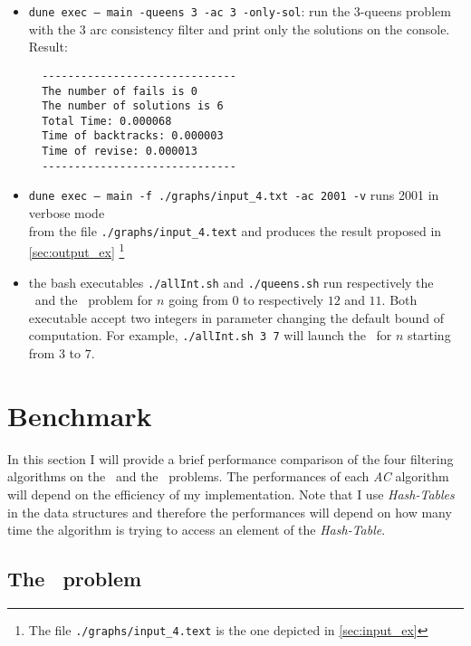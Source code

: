 \documentclass{rapport}
\begin{document}
\begin{itemize}
  \item \texttt{dune exec -- main -queens 3 -ac 3 -only-sol}: run the 3-queens problem with the \ac{3} arc consistency filter and print only the solutions on the console. Result:\\
        \begin{verbatim}
  ------------------------------
  The number of fails is 0
  The number of solutions is 6
  Total Time: 0.000068
  Time of backtracks: 0.000003
  Time of revise: 0.000013
  ------------------------------
  \end{verbatim}

  \item \texttt{dune exec -- main -f ./graphs/input\_4.txt -ac 2001 -v} runs \ac{2001} in verbose mode \\ from the file \texttt{./graphs/input\_4.text} and produces the result proposed in \cref{sec:output_ex} \footnote{The file \texttt{./graphs/input\_4.text} is the one depicted in \cref{sec:input_ex}}

  \item the bash executables \texttt{./allInt.sh} and \texttt{./queens.sh} run respectively the \allint\ and the \queens\ problem for $n$ going from $0$ to respectively $12$ and $11$. Both executable accept two integers in parameter changing the default bound of computation. For example, \texttt{./allInt.sh 3 7} will launch the \allint\ for $n$ starting from $3$ to $7$.

\end{itemize}



\section{Benchmark}

In this section I will provide a brief performance comparison of the four filtering algorithms on the \allint\ and the \queens\ problems. The performances of each \textit{AC} algorithm will depend on the efficiency of my implementation. Note that I use \textit{Hash-Tables} in the data structures and therefore the performances will depend on how many time the algorithm is trying to access an element of the \textit{Hash-Table}.

\subsection{The \allint\ problem}
\end{document}
